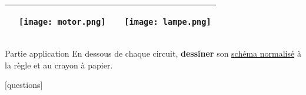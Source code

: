 \documentclass[11pt]{exam}		%
\begin{document}
\begin{questions}
\begin{center}
\begin{tabular}{|c|p{4cm}|||||c|p{4cm}|}
		& \hspace*{-1cm}\begin{minipage}{.3\textwidth}
			\begin{center}
				\texttt{[image: motor.png]}
			\end{center}
		  \end{minipage}  
		& %
		& \hspace*{-1cm}\begin{minipage}{.3\textwidth}
			\begin{center}
				\texttt{[image: lampe.png]}
			\end{center}
		  \end{minipage} \\
		\hline
		\end{tabular}
	\end{center}
	
	\vspace{10cm}

	{\huge Partie application}
	\question[8] 
	En dessous de chaque circuit, \textbf{dessiner} son \underline{schéma normalisé} à la règle et au crayon à papier.
	\begin{figure*}[hb]
		\centering		
		\hspace{5cm}
	\vspace{6cm}
		\centering		
		\hspace{5cm}
	\end{figure*}


\end{questions}

\vfill
\begin{center}
\setlength{\doublerulesep}{0.25in}
[questions]
\vspace{-25pt}
\end{center}
\end{document}
